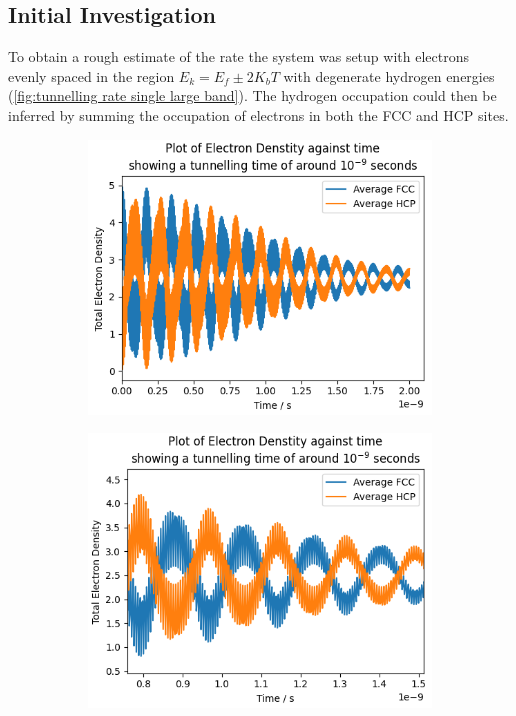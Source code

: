 \subsection{Initial Investigation}
To obtain a rough estimate of
the rate the system was setup
with electrons evenly spaced
in the region \(E_k = E_f \pm 2K_b T\)
with degenerate hydrogen energies (\cref{fig:tunnelling rate single large band}).
The hydrogen occupation
could then be inferred by
summing the occupation
of electrons in both the FCC and
HCP sites.
\begin{figure}[htbp]
    \captionsetup[subfigure]{justification=centering}
    \centering
    \begin{subfigure}{0.45\linewidth}
        \includegraphics[width=0.9\linewidth]{Figures/Simulation/Plot of large band simulation decay times.png}
        \label{fig:large band degenerate simulation}
    \end{subfigure}
    \begin{subfigure}{0.45\linewidth}
        \includegraphics[width=0.9\linewidth]{Figures/Simulation/Plot of large band simulation decay times rapid oscillations.png }

\end{subfigure}
\end{figure}
